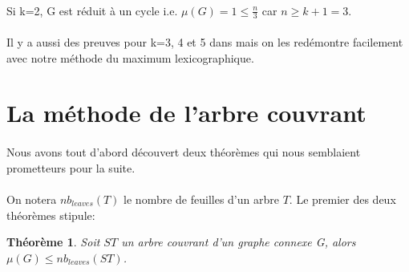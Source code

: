 \documentclass[a4paper]{article}
\newtheorem{theorem}{Théorème}
\theoremstyle{definition}
\theoremstyle{remark}
\begin{document}
\paragraph{}
Si k=2, G est réduit à un cycle i.e. $\mu(G)=1 \leq \frac{n}{3}$ car $n \geq k+1 = 3$.


\paragraph{}
Il y a aussi des preuves pour k=3, 4 et 5 dans \cite{MagnantMartin} mais on les redémontre facilement avec notre méthode du maximum lexicographique.

\section{La méthode de l'arbre couvrant}

\paragraph{}
Nous avons tout d'abord découvert deux théorèmes qui nous semblaient prometteurs pour la suite.

\paragraph{}
On notera $nb_{leaves}(T)$ le nombre de feuilles d'un arbre $T$. Le premier des deux théorèmes stipule:
\begin{theorem}
Soit $ST$ un arbre couvrant d'un graphe connexe G, alors $\mu(G) \leq nb_{leaves}(ST)$.
\end{theorem}
\end{document}

